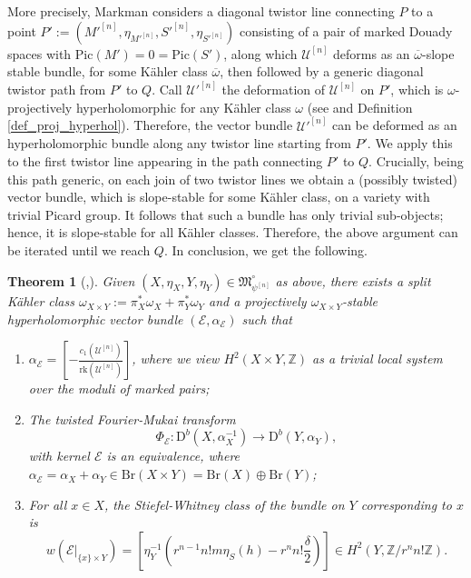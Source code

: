 \documentclass[12pt,a4paper]{amsart}
\theoremstyle{plain}
\newtheorem{thm}{Theorem}[section]
\theoremstyle{definition}
\theoremstyle{remark}
\def\Pic{\mathrm{Pic}}
\def\H{H}
\newcommand{\D}{\mathrm{D}^b}
\newcommand{\kE}{\mathcal{E}}
\newcommand{\rk}{\mathrm{rk}}
\newcommand{\Br}{\mathrm{Br}}
\newcommand{\psin}{{\psi^{[n]}}}
\newcommand{\cc}{c}
\begin{document}
More precisely, Markman considers a diagonal twistor line connecting $P$ to a point \linebreak[4]$P':=(M'^{[n]},\eta_{M'^{[n]}},S'^{[n]},\eta_{S'^{[n]}})$ consisting of a pair of marked Douady spaces with $\Pic(M')=0=\Pic(S')$, along which $\mathcal{U}^{[n]}$ deforms as an $\overline{\omega}$-slope stable bundle, for some K\"{a}hler class $\overline{\omega}$, then followed by a generic diagonal twistor path from $P'$ to $Q$.
Call $\mathcal{U}'^{[n]}$ the deformation of $\mathcal{U}^{[n]}$ on $P'$, which is $\omega$-projectively hyperholomorphic for any K\"{a}hler class $\omega$ (see \cite[Lemma 8.3]{markman} and Definition \ref{def_proj_hyperhol}).
Therefore, the vector bundle $\mathcal{U}'^{[n]}$ can be deformed as an hyperholomorphic bundle along any twistor line starting from $P'$.
We apply this to the first twistor line appearing in the path connecting $P'$ to $Q$.
Crucially, being this path generic, on each join of two twistor lines we obtain a (possibly twisted) vector bundle, which is slope-stable for some K\"{a}hler class, on a variety with trivial Picard group.
It follows that such a bundle has only trivial sub-objects; hence, it is slope-stable for all K\"{a}hler classes.
Therefore, the above argument can be iterated until we reach $Q$.
In conclusion, we get the following.

\begin{thm}[{\cite{markman},\cite[Theorem 2.3]{dequivconj}}]\label{thm_compatiblevectorbundle}
    Given $(X,\eta_X,Y,\eta_Y)\in\mathfrak{M}^\circ_{\psin}$ as above, there exists a split K\"ahler class $\omega_{X\times Y}:=\pi_X^*\omega_X+\pi_Y^*\omega_Y$ and a projectively $\omega_{X\times Y}$-stable hyperholomorphic vector bundle $(\kE,\alpha_\kE)$  such that
    \begin{enumerate}
        \item [{\normalfont{(1)}}] $\alpha_\mathcal{E}=\left[-\frac{\cc_1(\mathcal{U}^{[n]})}{\rk(\mathcal{U}^{[n]})}\right]$, where we view $\H^2(X\times Y,\mathbb{Z})$ as a trivial local system over the moduli of marked pairs;
        \item [{\normalfont{(2)}}] The twisted Fourier-Mukai transform
        \[
        \Phi_{\mathcal{E}}\colon \D(X,\alpha_X^{-1})\rightarrow \D(Y,\alpha_Y),
        \]
        with kernel $\kE$ is an equivalence, where $\alpha_\kE=\alpha_X+\alpha_Y\in \Br(X\times Y)=\Br(X)\oplus\Br(Y)$;
        \item [{\normalfont{(3)}}] For all $x\in X$, the Stiefel-Whitney class of the bundle on $Y$ corresponding to $x$ is
        \[w(\kE|_{\{x\}\times Y})=\left[\eta_Y^{-1}\left(r^{n-1}n!m\eta_S(h)-r^nn!\frac{\delta}{2}\right)\right]\in \H^2(Y,\mathbb{Z}/r^nn!\mathbb{Z}).\]
    \end{enumerate}
\end{thm}
\end{document}
